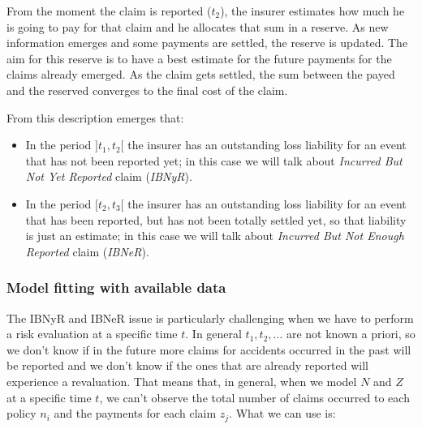 \documentclass[a4paper, nobind]{templates/ociamthesis}
\providecommand{\tightlist}{%
  \setlength{\itemsep}{0pt}\setlength{\parskip}{0pt}}
\theoremstyle{definition}
\theoremstyle{definition}
\theoremstyle{definition}
\theoremstyle{remark}
\begin{document}
From the moment the claim is reported (\(t_2\)), the insurer estimates how much he is going to pay for that claim and he allocates that sum in a reserve. As new information emerges and some payments are settled, the reserve is updated. The aim for this reserve is to have a best estimate for the future payments for the claims already emerged. As the claim gets settled, the sum between the payed and the reserved converges to the final cost of the claim.

From this description emerges that:

\begin{itemize}
\tightlist
\item
  In the period \(]t_1, t_2[\) the insurer has an outstanding loss liability for an event that has not been reported yet; in this case we will talk about \emph{Incurred But Not Yet Reported} claim (\emph{IBNyR}).
\item
  In the period \([t_2, t_3[\) the insurer has an outstanding loss liability for an event that has been reported, but has not been totally settled yet, so that liability is just an estimate; in this case we will talk about \emph{Incurred But Not Enough Reported} claim (\emph{IBNeR}).
\end{itemize}

\hypertarget{model-fitting-with-available-data}{%
\subsubsection{Model fitting with available data}\label{model-fitting-with-available-data}}

The IBNyR and IBNeR issue is particularly challenging when we have to perform a risk evaluation at a specific time \(t\). In general \(t_1, t_2,\dots\) are not known a priori, so we don't know if in the future more claims for accidents occurred in the past will be reported and we don't know if the ones that are already reported will experience a revaluation. That means that, in general, when we model \(N\) and \(Z\) at a specific time \(t\), we can't observe the total number of claims occurred to each policy \(n_i\) and the payments for each claim \(z_j\). What we can use is:
\end{document}
